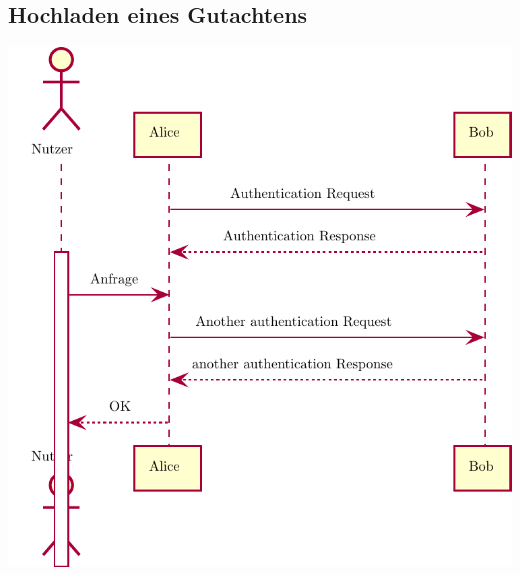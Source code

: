 \subsection{Hochladen eines Gutachtens}\label{subsec:hochladen-eines-gutachtens}

\includegraphics{graphics/upload_review}